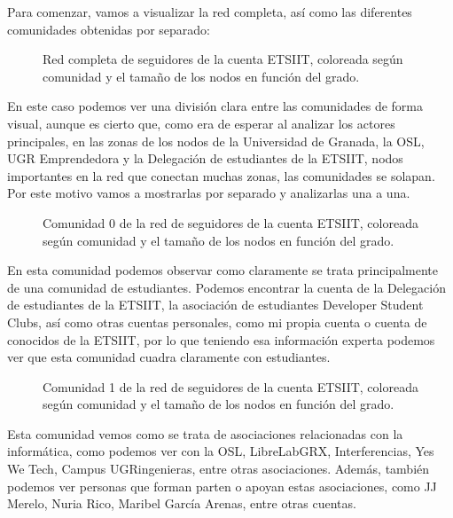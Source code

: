 Para comenzar, vamos a visualizar la red completa, así como las diferentes comunidades obtenidas por separado:



\newpage
\begin{figure}[H]
	\centering
	
	\caption{Red completa de seguidores de la cuenta ETSIIT, coloreada según comunidad y el tamaño de los nodos en función del grado.}
\end{figure}
\vspace{18cm}
En este caso podemos ver una división clara entre las comunidades de forma visual, aunque es cierto que, como era de esperar al analizar los actores principales, en las zonas de los nodos de la Universidad de Granada, la OSL, UGR Emprendedora y la Delegación de estudiantes de la ETSIIT, nodos importantes en la red que conectan muchas zonas, las comunidades se solapan. Por este motivo vamos a mostrarlas por separado y analizarlas una a una.
\newpage


\newpage
\begin{figure}[H]
	\centering
	
	\caption{Comunidad 0 de la red de seguidores de la cuenta ETSIIT, coloreada según comunidad y el tamaño de los nodos en función del grado.}
\end{figure}
\vspace{18cm}
En esta comunidad podemos observar como claramente se trata principalmente de una comunidad de estudiantes. Podemos encontrar la cuenta de la Delegación de estudiantes de la ETSIIT, la asociación de estudiantes Developer Student Clubs, así como otras cuentas personales, como mi propia cuenta o cuenta de conocidos de la ETSIIT, por lo que teniendo esa información experta podemos ver que esta comunidad cuadra claramente con estudiantes.
\newpage

\newpage
\begin{figure}[H]
	\centering
	
	\caption{Comunidad 1 de la red de seguidores de la cuenta ETSIIT, coloreada según comunidad y el tamaño de los nodos en función del grado.}
\end{figure}
\vspace{18cm}
Esta comunidad vemos como se trata de asociaciones relacionadas con la informática, como podemos ver con la OSL, LibreLabGRX, Interferencias, Yes We Tech, Campus UGRingenieras, entre otras asociaciones. Además, también podemos ver personas que forman parten o apoyan estas asociaciones, como JJ Merelo, Nuria Rico, Maribel García Arenas, entre otras cuentas.
\newpage


